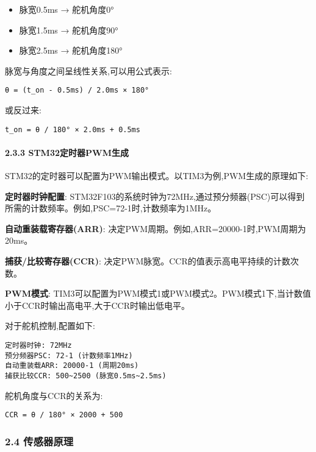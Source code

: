 \documentclass[
]{article}
\providecommand{\tightlist}{%
  \setlength{\itemsep}{0pt}\setlength{\parskip}{0pt}}
\begin{document}
\begin{itemize}
\tightlist
\item
  脉宽0.5ms → 舵机角度0°
\item
  脉宽1.5ms → 舵机角度90°
\item
  脉宽2.5ms → 舵机角度180°
\end{itemize}

脉宽与角度之间呈线性关系,可以用公式表示:

\begin{verbatim}
θ = (t_on - 0.5ms) / 2.0ms × 180°
\end{verbatim}

或反过来:

\begin{verbatim}
t_on = θ / 180° × 2.0ms + 0.5ms
\end{verbatim}

\hypertarget{stm32ux5b9aux65f6ux5668pwmux751fux6210}{%
\paragraph{2.3.3
STM32定时器PWM生成}\label{stm32ux5b9aux65f6ux5668pwmux751fux6210}}

STM32的定时器可以配置为PWM输出模式。以TIM3为例,PWM生成的原理如下:

\textbf{定时器时钟配置}:
STM32F103的系统时钟为72MHz,通过预分频器(PSC)可以得到所需的计数频率。例如,PSC=72-1时,计数频率为1MHz。

\textbf{自动重装载寄存器(ARR)}:
决定PWM周期。例如,ARR=20000-1时,PWM周期为20ms。

\textbf{捕获/比较寄存器(CCR)}:
决定PWM脉宽。CCR的值表示高电平持续的计数次数。

\textbf{PWM模式}:
TIM3可以配置为PWM模式1或PWM模式2。PWM模式1下,当计数值小于CCR时输出高电平,大于CCR时输出低电平。

对于舵机控制,配置如下:

\begin{verbatim}
定时器时钟: 72MHz
预分频器PSC: 72-1 (计数频率1MHz)
自动重装载ARR: 20000-1 (周期20ms)
捕获比较CCR: 500~2500 (脉宽0.5ms~2.5ms)
\end{verbatim}

舵机角度与CCR的关系为:

\begin{verbatim}
CCR = θ / 180° × 2000 + 500
\end{verbatim}

\hypertarget{ux4f20ux611fux5668ux539fux7406}{%
\subsubsection{2.4 传感器原理}\label{ux4f20ux611fux5668ux539fux7406}}
\end{document}
